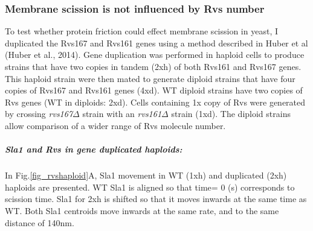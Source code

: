 	\subsubsection{Membrane scission is not influenced by Rvs number}
To test whether protein friction could effect membrane scission in yeast, I duplicated the Rvs167 and Rvs161 genes using a method described in Huber et al (Huber et al., 2014). Gene duplication was performed in haploid cells to produce strains that have two copies in tandem (2xh) of both Rvs161 and Rvs167 genes. This haploid strain were then mated to generate diploid strains that have four copies of Rvs167 and Rvs161 genes (4xd). WT diploid strains have two copies of Rvs genes (WT in diploids: 2xd). Cells containing 1x copy of Rvs were generated by crossing \textit{rvs167$\Delta$}
 strain with an \textit{rvs161$\Delta$} strain (1xd). The diploid strains allow comparison of a wider range of Rvs molecule number. 



	

		\subparagraph{Sla1 and Rvs in gene duplicated haploids:}

In Fig.\ref{fig_rvshaploid}A, Sla1 movement in WT (1xh) and duplicated (2xh) haploids are presented. WT Sla1 is aligned so that time= 0 (s) corresponds to scission time. Sla1 for 2xh is shifted so that it moves inwards at the same time as WT. Both Sla1 centroids move inwards at the same rate, and to the same distance of 140nm. 

